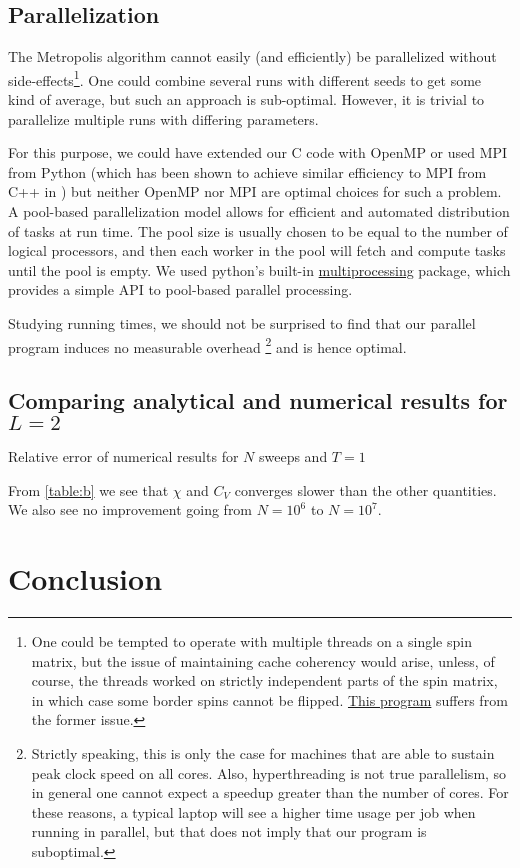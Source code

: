 \documentclass[a4paper]{article}
\begin{document}
\subsection{Parallelization}
The Metropolis algorithm cannot easily (and efficiently) be parallelized without side-effects\footnote{One could be tempted to operate with multiple threads on a single spin matrix, but the issue of maintaining cache coherency would arise, unless, of course, the threads worked on strictly independent parts of the spin matrix, in which case some border spins cannot be flipped.  \href{https://github.com/CompPhysics/ComputationalPhysics/blob/082ee7e/doc/Programs/ParallelizationOpenMP/OpenMPising.cpp}{This program} suffers from the former issue.}. One could combine several runs with different seeds to get some kind of average, but such an approach is sub-optimal. However, it is trivial to parallelize multiple runs with differing parameters.

For this purpose, we could have extended our C code with OpenMP or used MPI from Python (which has been shown to achieve similar efficiency to MPI from C++ in \cite{mortensen_langtangen_hpc_python}) but neither OpenMP nor MPI are optimal choices for such a problem. A pool-based parallelization model allows for efficient and automated distribution of tasks at run time. The pool size is usually chosen to be equal to the number of logical processors, and then each worker in the pool will fetch and compute tasks until the pool is empty. We used python's built-in \href{https://docs.python.org/2/library/multiprocessing.html}{multiprocessing} package, which provides a simple API to pool-based parallel processing.

Studying running times, we should not be surprised to find that our parallel program induces no measurable overhead \footnote{Strictly speaking, this is only the case for machines that are able to sustain peak clock speed on all cores. Also, hyperthreading is not true parallelism, so in general one cannot expect a speedup greater than the number of cores. For these reasons, a typical laptop will see a higher time usage per job when running in parallel, but that does not imply that our program is suboptimal.} and is hence optimal.

\subsection{Comparing analytical and numerical results for $L=2$}
\begin{table}
    
    \caption{Relative error of numerical results for $N$ sweeps and $T=1$}
    \label{table:b}
\end{table}

From \ref{table:b} we see that $\chi$ and $C_V$ converges slower than the other quantities. We also see no improvement going from $N=10^{6}$ to $N=10^{7}$.

\section{Conclusion}\label{sec:conclusion}

%
%

{}
\end{document}
